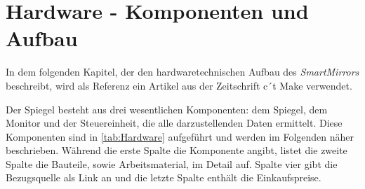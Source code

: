 


\section{Hardware - Komponenten und Aufbau}
\label{chapter:kap1}
In dem folgenden Kapitel, der den hardwaretechnischen Aufbau des \textit{SmartMirrors} beschreibt, wird als Referenz ein Artikel aus der Zeitschrift c´t Make verwendet.\cite{make042017smartmirror}

Der Spiegel besteht aus drei wesentlichen Komponenten: dem Spiegel, dem Monitor und der Steuereinheit, die alle darzustellenden Daten ermittelt. Diese Komponenten sind in \autoref{tab:Hardware} aufgeführt und werden im Folgenden näher beschrieben. Während die erste Spalte die Komponente angibt, listet die zweite Spalte die Bauteile, sowie Arbeitsmaterial, im Detail auf. Spalte vier gibt die Bezugsquelle als Link an und die letzte Spalte enthält die Einkaufspreise.
